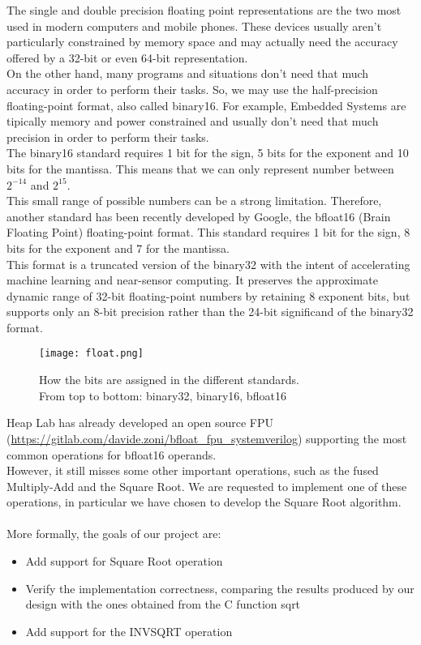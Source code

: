 The single and double precision floating point representations are the two most used in modern computers and mobile phones. These devices usually aren’t particularly constrained by memory space and may actually need the accuracy offered by a 32-bit or even 64-bit representation.\\
On the other hand, many programs and situations don’t need that much accuracy in order to perform their tasks. So, we may use the half-precision floating-point format, also called binary16. For example, Embedded Systems are tipically memory and power constrained and usually don't need that much precision in order to perform their tasks. \\
The binary16 standard requires 1 bit for the sign, 5 bits for the exponent and 10 bits for the mantissa. This means that we can only represent number between $2^{-14}$ and $2^{15}$.\\
This small range of possible numbers can be a strong limitation. Therefore, another standard has been recently developed by Google, the bfloat16 (Brain Floating Point) floating-point format. This standard requires 1 bit for the sign, 8 bits for the exponent and 7 for the mantissa. \\
This format is a truncated version of the binary32 with the intent of accelerating machine learning and near-sensor computing. It preserves the approximate dynamic range of 32-bit floating-point numbers by retaining 8 exponent bits, but supports only an 8-bit precision rather than the 24-bit significand of the binary32 format. 

\begin{figure}[h]
	\centering
	\captionsetup{justification=centering}
	\texttt{[image: float.png]}	
	\caption{How the bits are assigned in the different standards. \\From top to bottom: binary32, binary16, bfloat16}
\end{figure}

Heap Lab has already developed an open source FPU (\url{https://gitlab.com/davide.zoni/bfloat_fpu_systemverilog}) supporting the most common operations for bfloat16 operands. \\
However, it still misses some other important operations, such as the fused Multiply-Add and the Square Root. We are requested to implement one of these operations, in particular we have chosen to develop the Square Root algorithm.\\
\\
More formally, the goals of our project are:
\begin{itemize}
	\item Add support for Square Root operation
	\item Verify the implementation correctness, comparing the results produced by our design with the ones obtained from the C function sqrt
	\item Add support for the INVSQRT operation
\end{itemize}

\clearpage
